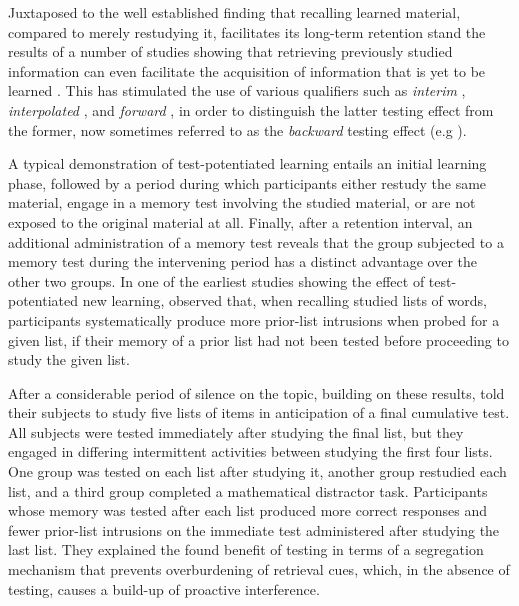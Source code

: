 \documentclass[../main.tex]{subfiles}
\begin{document}
Juxtaposed to the well established finding that recalling learned material, compared to merely restudying it, facilitates its long-term retention \citep{roedigeriiiPowerTestingMemory2006, roedigeriiiTestEnhancedLearningTaking2006, rowlandEffectTestingRestudy2014, adesopeRethinkingUseTests2017, roedigeriiiCriticalRoleRetrieval2011, gloverTestingPhenomenonNot1989} stand the results of a number of studies showing that retrieving previously studied information can even facilitate the acquisition of information that is yet to be learned \citep{chanRetrievalPotentiatesNew2018, yangEnhancingLearningRetrieval2018}. This has stimulated the use of various qualifiers such as \textit{interim} \citep{wissmanInterimTestEffect2011}, \textit{interpolated} \citep{szpunarInterpolatedMemoryTests2013}, and \textit{forward} \citep{pastotterRetrievalPracticeEnhances2014,yangEnhancingLearningRetrieval2018}, in order to distinguish the latter testing effect from the former, now sometimes referred to as the \textit{backward} testing effect (e.g \citealp{yangEnhancingLearningRetrieval2018}). 

A typical demonstration of test-potentiated learning entails an initial learning phase, followed by a period during which participants either restudy the same material, engage in a memory test involving the studied material, or are not exposed to the original material at all. Finally, after a retention interval, an additional administration of a memory test reveals that the group subjected to a memory test during the intervening period has a distinct advantage over the other two groups. In one of the earliest studies showing the effect of test-potentiated new learning, \cite{darleyEffectsPriorFree1971} observed that, when recalling studied lists of words, participants systematically produce more prior-list intrusions when probed for a given list, if their memory of a prior list had not been tested before proceeding to study the given list. 

After a considerable period of silence on the topic, building on these results, \cite{szpunarTestingStudyInsulates2008} told their subjects to study five lists of items in anticipation of a final cumulative test. All subjects were tested immediately after studying the final list, but they engaged in differing intermittent activities between studying the first four lists. One group was tested on each list after studying it, another group restudied each list, and a third group completed a mathematical distractor task. Participants whose memory was tested after each list produced more correct responses and fewer prior-list intrusions on the immediate test administered after studying the last list. They explained the found benefit of testing in terms of a segregation mechanism that prevents overburdening of retrieval cues, which, in the absence of testing, causes a build-up of proactive interference.
\end{document}
